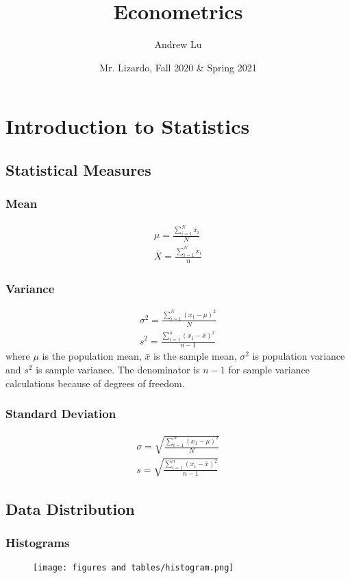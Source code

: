 \documentclass[12pt]{article}
\title{Econometrics}
\author{Andrew Lu}
\date{Mr. Lizardo, Fall 2020 \& Spring 2021}
\numberwithin{equation}{section}
\begin{document}
    \maketitle
    \label{sec:top}
    \tableofcontents

\section{Introduction to Statistics}

\subsection{Statistical Measures}
\subsubsection{Mean}
\begin{align}
    \mu=\frac{\sum\limits_{i=1}^{N}{x_i}}{N} \\
    \overline{X}=\frac{\sum\limits_{i=1}^{N}{x_i}}{n}
\end{align}

\subsubsection{Variance}
\begin{align}
    \sigma^2=\frac{\sum\limits_{i=1}^{N}{(x_1-\mu)^2}}{N} \\
    s^2=\frac{\sum\limits_{i=1}^{n}{(x_1-\bar{x})^2}}{n-1}
\end{align}
where $\mu$ is the population mean, $\bar{x}$ is the sample mean, $\sigma^2$ is population variance and $s^2$ is sample variance. The denominator is $n-1$ for sample variance calculations because of degrees of freedom.

\subsubsection{Standard Deviation}
\begin{align}
    \sigma=\sqrt{\frac{\sum\limits_{i=1}^{N}{(x_1-\mu)^2}}{N}} \\
    s=\sqrt{\frac{\sum\limits_{i=1}^{n}{(x_1-\bar{x})^2}}{n-1}}
\end{align}

\subsection{Data Distribution}
\subsubsection{Histograms}
\begin{figure}[!ht]
    \centering
    \texttt{[image: figures and tables/histogram.png]}
\end{figure}
\end{document}
